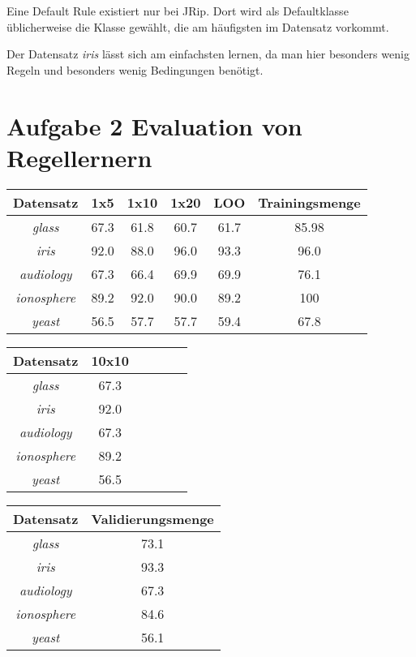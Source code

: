 Eine Default Rule existiert nur bei JRip. Dort wird als Defaultklasse \"ublicherweise die Klasse gew\"ahlt, die am h\"aufigsten im Datensatz vorkommt. 

Der Datensatz \emph{iris} l\"asst sich am einfachsten lernen, da man hier besonders wenig Regeln und besonders wenig Bedingungen ben\"otigt.



\section{Aufgabe 2 Evaluation von Regellernern} %
\label{sec:aufgabe_2_evaluation_von_regellernern}

\begin{tabular}{c|c|c|c|c|c}
				Datensatz         & 1x5  & 1x10 & 1x20 & LOO  & Trainingsmenge   \\ \hline
				\emph{glass}      & 67.3 & 61.8 & 60.7 & 61.7 & 85.98   \\ \hline
				\emph{iris}       & 92.0 & 88.0 & 96.0 & 93.3 & 96.0    \\ \hline
				\emph{audiology}  & 67.3 & 66.4 & 69.9 & 69.9 & 76.1    \\ \hline
				\emph{ionosphere} & 89.2 & 92.0 & 90.0 & 89.2 & 100   \\ \hline
				\emph{yeast}      & 56.5 & 57.7 & 57.7 & 59.4 & 67.8   \\ \hline
\end{tabular}

\begin{tabular}{c|c|c|c|c|c}
				Datensatz         & 10x10    \\ \hline
				\emph{glass}      & 67.3     \\ \hline
				\emph{iris}       & 92.0     \\ \hline
				\emph{audiology}  & 67.3     \\ \hline
				\emph{ionosphere} & 89.2     \\ \hline
				\emph{yeast}      & 56.5     \\ \hline
\end{tabular}


\begin{tabular}{c|c}
				Datensatz         & Validierungsmenge    \\ \hline
				\emph{glass}      & 73.1     \\ \hline
				\emph{iris}       & 93.3     \\ \hline
				\emph{audiology}  & 67.3   \\ \hline
				\emph{ionosphere} & 84.6   \\ \hline
				\emph{yeast}      & 56.1 \\ \hline
\end{tabular}

